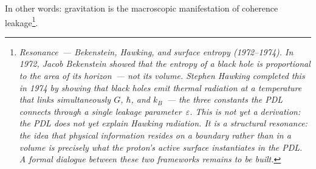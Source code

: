 \documentclass[12pt, a4paper, openright]{book}
\begin{document}
In other words: gravitation is the macroscopic manifestation of coherence leakage\footnote{\textit{Resonance~--- Bekenstein, Hawking, and surface entropy (1972--1974). In 1972, Jacob Bekenstein showed that the entropy of a black hole is proportional to the area of its horizon~--- not its volume. Stephen Hawking completed this in 1974 by showing that black holes emit thermal radiation at a temperature that links simultaneously $G$, $\hbar$, and $k_B$~--- the three constants the PDL connects through a single leakage parameter~$\varepsilon$. This is not yet a derivation: the PDL does not yet explain Hawking radiation. It is a structural resonance: the idea that physical information resides on a boundary rather than in a volume is precisely what the proton's active surface instantiates in the PDL\@. A formal dialogue between these two frameworks remains to be built.}}. 
\end{document}
